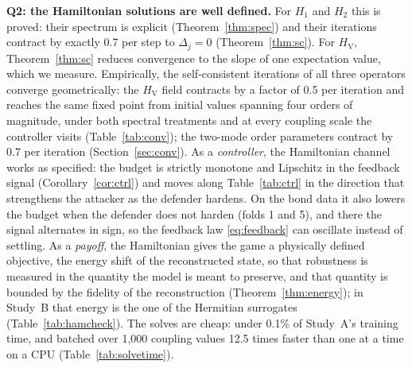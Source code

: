 \documentclass[conference]{IEEEtran}
\newcommand{\HV}{H_{\mathrm{V}}}
\begin{document}
\textbf{Q2: the Hamiltonian solutions are well defined.} For $H_1$ and $H_2$ this is proved: their spectrum is explicit (Theorem~\ref{thm:spec}) and their iterations contract by exactly 0.7 per step to $\Delta_j=0$ (Theorem~\ref{thm:sc}). For $\HV$, Theorem~\ref{thm:sc} reduces convergence to the slope of one expectation value, which we measure. Empirically, the self-consistent iterations of all three operators converge geometrically: the $\HV$ field contracts by a factor of 0.5 per iteration and reaches the same fixed point from initial values spanning four orders of magnitude, under both spectral treatments and at every coupling scale the controller visits (Table~\ref{tab:conv}); the two-mode order parameters contract by 0.7 per iteration (Section~\ref{sec:conv}). As a \emph{controller}, the Hamiltonian channel works as specified: the budget is strictly monotone and Lipschitz in the feedback signal (Corollary~\ref{cor:ctrl}) and moves along Table~\ref{tab:ctrl} in the direction that strengthens the attacker as the defender hardens. On the bond data it also lowers the budget when the defender does not harden (folds 1 and 5), and there the signal alternates in sign, so the feedback law \eqref{eq:feedback} can oscillate instead of settling. As a \emph{payoff}, the Hamiltonian gives the game a physically defined objective, the energy shift of the reconstructed state, so that robustness is measured in the quantity the model is meant to preserve, and that quantity is bounded by the fidelity of the reconstruction (Theorem~\ref{thm:energy}); in Study~B that energy is the one of the Hermitian surrogates (Table~\ref{tab:hamcheck}). The solves are cheap: under 0.1\% of Study~A's training time, and batched over 1,000 coupling values 12.5 times faster than one at a time on a CPU (Table~\ref{tab:solvetime}).
\end{document}
